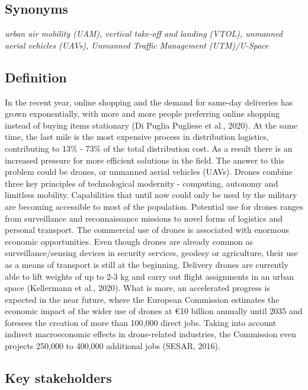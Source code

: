\documentclass[
]{book}
\begin{document}
\hypertarget{synonyms-19}{%
\subsection*{Synonyms}\label{synonyms-19}}

\emph{urban air mobility (UAM), vertical take-off and landing (VTOL), unmanned aerial vehicles (UAVs), Unmanned Traffic Management (UTM)/U-Space}

\hypertarget{definition-21}{%
\subsection*{Definition}\label{definition-21}}

In the recent year, online shopping and the demand for same-day deliveries has grown exponentially, with more and more people preferring online shopping instead of buying items stationary (Di Puglia Pugliese et al., 2020). At the same time, the last mile is the most expensive process in distribution logistics, contributing to 13\% - 73\% of the total distribution cost. As a result there is an increased pressure for more efficient solutions in the field. The answer to this problem could be drones, or unmanned aerial vehicles (UAVs). Drones combine three key principles of technological modernity - computing, autonomy and limitless mobility. Capabilities that until now could only be used by the military are becoming accessible to most of the population. Potential use for drones ranges from surveillance and reconnaissance missions to novel forms of logistics and personal transport. The commercial use of drones is associated with enormous economic opportunities. Even though drones are already common as surveillance/sensing devices in security services, geodesy or agriculture, their use as a means of transport is still at the beginning. Delivery drones are currently able to lift weights of up to 2-3 kg and carry out flight assignments in an urban space (Kellermann et al., 2020).
What is more, an accelerated progress is expected in the near future, where the European Commission estimates the economic impact of the wider use of drones at €10 billion annually until 2035 and foresees the creation of more than 100,000 direct jobs. Taking into account indirect macroeconomic effects in drone-related industries, the Commission even projects 250,000 to 400,000 additional jobs (SESAR, 2016).

\hypertarget{key-stakeholders-21}{%
\subsection*{Key stakeholders}\label{key-stakeholders-21}}
\end{document}
